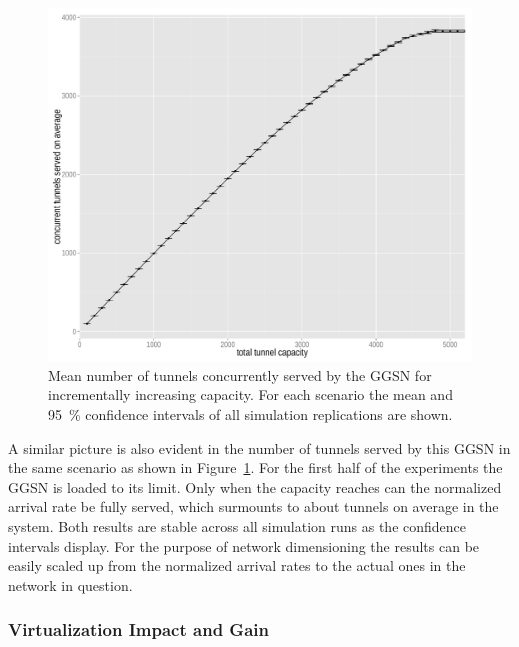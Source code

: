 \begin{figure}[htb]
	\centering
	\includegraphics[width=1.0\textwidth]{images/R-monolithic-tunnelusage.pdf}
	\caption{Mean number of tunnels concurrently served by the \gls{GGSN} for incrementally increasing capacity. For each scenario the mean and \SI{95}{\percent} confidence intervals of all simulation replications are shown.}
\label{c4:fig:traditional_tunnelusage}
\end{figure}


A similar picture is also evident in the number of tunnels served by this \gls{GGSN} in the same scenario as shown in Figure~\ref{c4:fig:traditional_tunnelusage}. For the first half of the experiments the \gls{GGSN} is loaded to its limit. Only when the capacity reaches  can the normalized arrival rate be fully served, which surmounts to about  tunnels on average in the system. Both results are stable across all simulation runs as the confidence intervals display. For the purpose of network dimensioning the results can be easily scaled up from the normalized arrival rates to the actual ones in the network in question.


\subsubsection{Virtualization Impact and Gain}

